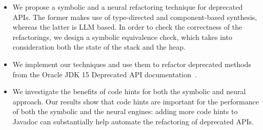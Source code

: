 \documentclass[sigconf]{acmart}
\begin{document}
\begin{itemize}

\item We propose a symbolic and a neural refactoring technique for deprecated APIs. The former makes use of type-directed and component-based synthesis, whereas the latter is LLM based. In order to check the correctness of the refactorings, we design a symbolic equivalence check, which takes into consideration both the state of the stack and the heap.


\item We implement our techniques and use them to refactor deprecated methods from the Oracle
JDK 15 Deprecated API documentation~\cite{OracleJdk15DeprecatedAPI}.

\item We investigate the benefits of code hints for both the symbolic and neural approach. %
  Our results show that code hints are important for the performance of both the symbolic and the neural engines: adding more code hints to Javadoc
can substantially help automate the refactoring of deprecated APIs.


\end{itemize}
\end{document}
